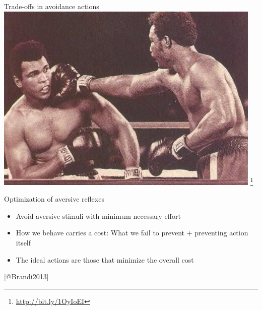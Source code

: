 
\begin{frame}{Trade-offs in avoidance actions}
	\includegraphics{images/ali.png}
	\footnote{\url{http://bit.ly/1OyIoEI}}
\end{frame}


\begin{frame}{Optimization of aversive reflexes}
	\begin{itemize}
		\item Avoid aversive stimuli with minimum necessary effort
		\item How we behave carries a cost: What we fail to prevent + preventing action itself
		\item The ideal actions are those that minimize the overall cost
	\end{itemize}
	[@Brandi2013]
\end{frame}


